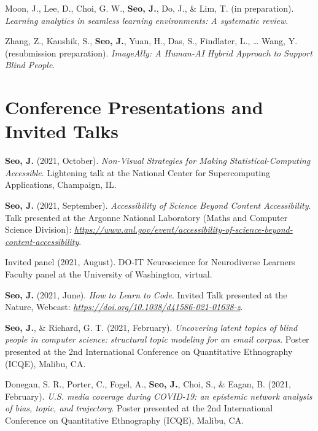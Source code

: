 \documentclass[11pt,a4paper,]{awesome-cv}
\begin{document}
\hypertarget{refs_working_paper}{}
\leavevmode{}%
Moon, J., Lee, D., Choi, G. W., \textbf{Seo, J.}, Do, J., \& Lim, T. (in
preparation). \emph{Learning analytics in seamless learning
  environments: A systematic review}.

\leavevmode{}%
Zhang, Z., Kaushik, S., \textbf{Seo, J.}, Yuan, H., Das, S., Findlater,
L., \ldots{} Wang, Y. (resubmission preparation). \emph{{ImageAlly}: A
    {Human-AI Hybrid Approach} to {Support Blind People}}.



\hypertarget{conference-presentations-and-invited-talks}{%
  \section{Conference Presentations and Invited
    Talks}\label{conference-presentations-and-invited-talks}}

\textbf{Seo, J.} (2021, October). \emph{Non-Visual Strategies for Making
  Statistical-Computing Accessible}. Lightening talk at the National
Center for Supercomputing Applications, Champaign, IL.

\textbf{Seo, J.} (2021, September). \emph{Accessibility of Science
  Beyond Content Accessibility}. Talk presented at the Argonne National
Laboratory (Maths and Computer Science Division):
\emph{\url{https://www.anl.gov/event/accessibility-of-science-beyond-content-accessibility}}.

Invited panel (2021, August). DO-IT Neuroscience for Neurodiverse
Learners Faculty panel at the University of Washington, virtual.

\textbf{Seo, J.} (2021, June). \emph{How to Learn to Code}. Invited Talk
presented at the Nature, Webcast:
\emph{\url{https://doi.org/10.1038/d41586-021-01638-z}}.

\textbf{Seo, J.}, \& Richard, G. T. (2021, February). \emph{Uncovering
  latent topics of blind people in computer science: structural topic
  modeling for an email corpus}. Poster presented at the 2nd International
Conference on Quantitative Ethnography (ICQE), Malibu, CA.

Donegan, S. R., Porter, C., Fogel, A., \textbf{Seo, J.}, Choi, S., \&
Eagan, B. (2021, February). \emph{U.S. media coverage during COVID-19:
  an epistemic network analysis of bias, topic, and trajectory}. Poster
presented at the 2nd International Conference on Quantitative
Ethnography (ICQE), Malibu, CA.
\end{document}
